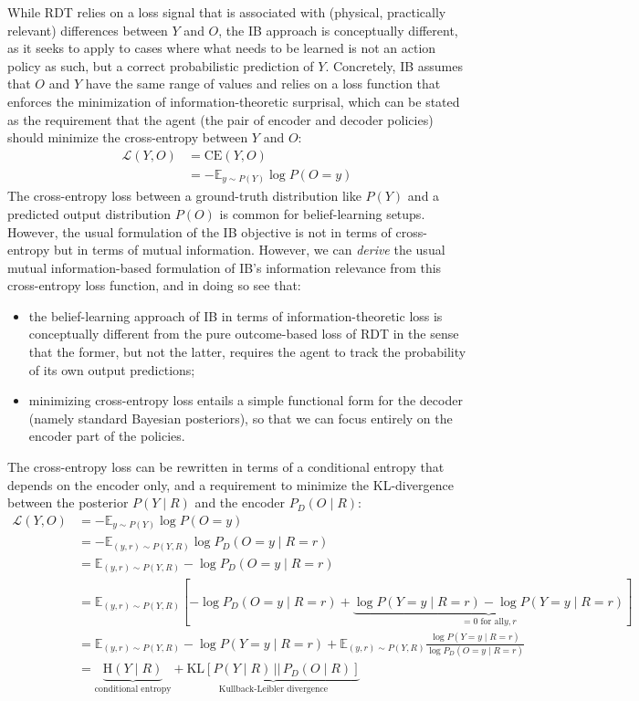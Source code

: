 \documentclass[nobib,nofonts]{tufte-handout}
\begin{document}
While RDT relies on a loss signal that is associated with (physical, practically relevant) differences between $Y$ and $O$, the IB approach is conceptually different, as it seeks to apply to cases where what needs to be learned is not an action policy as such, but a correct probabilistic prediction of $Y$.
Concretely, IB assumes that $O$ and $Y$ have the same range of values and relies on a loss function that enforces the minimization of information-theoretic surprisal, which can be stated as the requirement that the agent (the pair of encoder and decoder policies) should minimize the cross-entropy between $Y$ and $O$:
\begin{align*}
  \mathcal{L}(Y,O) & = \text{CE}(Y,O) \\
  & = - \mathbb{E}_{y \sim P(Y)} \log P(O=y)
\end{align*}
The cross-entropy loss between a ground-truth distribution like $P(Y)$ and a predicted output distribution $P(O)$ is common for belief-learning setups.
However, the usual formulation of the IB objective is not in terms of cross-entropy but in terms of mutual information.
However, we can \emph{derive} the usual mutual information-based formulation of IB's information relevance from this cross-entropy loss function, and in doing so see that:
\begin{itemize}
  \item the belief-learning approach of IB in terms of information-theoretic loss is conceptually different from the pure outcome-based loss of RDT in the sense that the former, but not the latter, requires the agent to track the probability of its own output predictions;
  \item minimizing cross-entropy loss entails a simple functional form for the decoder (namely standard Bayesian posteriors), so that we can focus entirely on the encoder part of the policies.
\end{itemize}


The cross-entropy loss can be rewritten in terms of a conditional entropy that depends on the encoder only, and a requirement to minimize the KL-divergence between the posterior $P(Y \mid R)$ and the encoder $P_{D}(O \mid R)$:
\begin{align*}
  \mathcal{L}(Y,O)
  & = - \mathbb{E}_{y \sim P(Y)} \log P(O=y)
  \\
  & = - \mathbb{E}_{(y,r) \sim P(Y,R)} \log P_{D}(O=y \mid R=r)
  \\
  & = \mathbb{E}_{(y,r) \sim P(Y,R)} - \log P_{D}(O=y \mid R=r)
  \\
  & = \mathbb{E}_{(y,r) \sim P(Y,R)} [- \log P_{D}(O=y \mid R=r) + \underbrace{\log P(Y=y \mid R=r) - \log P(Y=y \mid R=r)}_{=0 \text{\ \ for all} y, r}]
  \\
  & = \mathbb{E}_{(y,r) \sim P(Y,R)} - \log P(Y=y \mid R=r) + \mathbb{E}_{(y,r) \sim P(Y,R)} \frac{\log P(Y=y \mid R=r)}{\log P_{D}(O=y \mid R=r)}
  \\
  & = \underbrace{\text{H}(Y \mid R)}_{\text{conditional entropy}} + \underbrace{\text{KL}[P(Y \mid R)\, ||\, P_{D}(O \mid R)]}_{\text{Kullback-Leibler divergence}}
\end{align*}
\end{document}
